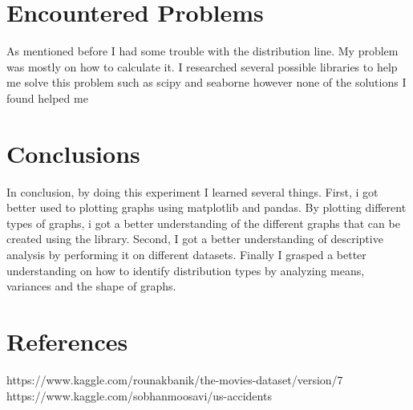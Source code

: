 \documentclass{article}
\begin{document}
\section{Encountered Problems}
As mentioned before I had some trouble with the distribution line. My problem was mostly on how to calculate it. I researched several possible libraries to help me solve this problem such as scipy and seaborne however none of the solutions I found helped me

\section{Conclusions}
In conclusion, by doing this experiment I learned several things. First, i got better used to plotting graphs using matplotlib and pandas. By plotting different types of graphs, i got a better understanding of the different graphs that can be created using the library. Second, I got a better understanding of descriptive analysis by performing it on different datasets. Finally I grasped a better understanding on how to identify distribution types by analyzing means, variances and the shape of graphs.

\section{References}

https://www.kaggle.com/rounakbanik/the-movies-dataset/version/7 \\
https://www.kaggle.com/sobhanmoosavi/us-accidents
\end{document}
